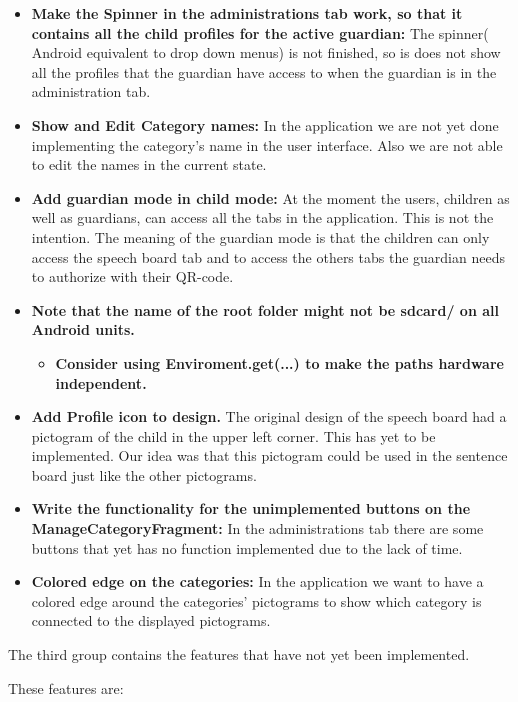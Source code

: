 \begin{itemize}
	\item \textbf{Make the Spinner in the administrations tab work, so that it contains all the child profiles for the active guardian:} The spinner( Android equivalent to drop down menus) is not finished, so is does not show all the profiles that the guardian have access to when the guardian is in the administration tab.  
	\item \textbf{Show and Edit Category names:} In the application we are not yet done implementing the category's name in the user interface. Also we are not able to edit the names in the current state. 
	 
	\item \textbf{Add guardian mode in child mode:} At the moment the users, children as well as guardians, can access all the tabs in the application. This is not the intention. The meaning of the guardian mode is that the children can only access the speech board tab and to access the others tabs the guardian needs to authorize with their QR-code.  
	
	\item \textbf{Note that the name of the root folder might not be sdcard/ on all Android units.}
	\begin{itemize}
		\item \textbf{Consider using Enviroment.get(...) to make the paths hardware independent.}
	\end{itemize}
	\item \textbf{Add Profile icon to design.} The original design of the speech board had a pictogram of the child in the upper left corner. This has yet to be implemented. Our idea was that this pictogram could be used in the sentence board just like the other pictograms.
	\item \textbf{Write the functionality for the unimplemented buttons on the ManageCategoryFragment:} In the administrations tab there are some buttons that yet has no function implemented due to the lack of time.
	 
	\item \textbf{Colored edge on the categories:} In the application we want to have a colored edge around the categories' pictograms to show which category is connected to the displayed pictograms.
\end{itemize}


The third group contains the features that have not yet been implemented.

These features are: 

